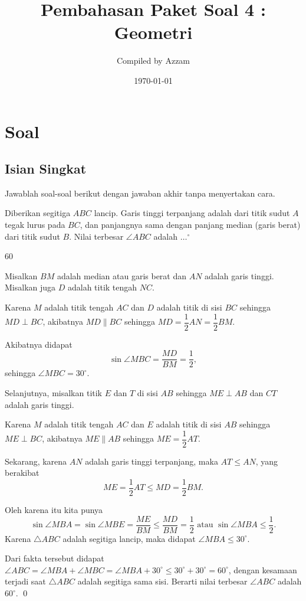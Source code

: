 \documentclass[11pt]{scrartcl}
\begin{document}
	\title{Pembahasan Paket Soal 4 : Geometri} %
	\date{\today}
	\author{Compiled by Azzam}
	\maketitle
	\newpage
	
	\section{Soal}
\subsection{Isian Singkat}
Jawablah soal-soal berikut dengan jawaban akhir tanpa menyertakan cara.

	\begin{soalbaru}
		Diberikan segitiga $ABC$ lancip. Garis tinggi terpanjang adalah dari titik sudut $A$ tegak
			lurus pada $BC$, dan panjangnya sama dengan panjang median (garis berat) dari titik sudut $B$.
			Nilai terbesar $\angle ABC$ adalah $\dots^\circ$
			
			\begin{jawaban}
			60
			\end{jawaban}
			\begin{solusi}
			Misalkan $BM$ adalah median atau garis berat dan $AN$ adalah garis tinggi. Misalkan juga $D$ adalah titik tengah $NC$.
			
			Karena $M$ adalah titik tengah $AC$ dan $D$ adalah titik di sisi $BC$ sehingga $MD \perp BC$, akibatnya $MD \parallel BC$ sehingga $MD=\dfrac{1}{2}AN=\dfrac{1}{2}BM$.
			
			Akibatnya didapat $$\sin \angle MBC = \dfrac{MD}{BM} = \dfrac{1}{2},$$ sehingga $\angle MBC = 30^\circ$.
			
			Selanjutnya, misalkan titik $E$ dan $T$ di sisi $AB$ sehingga $ME \perp AB$ dan $CT$ adalah garis tinggi.
			
			Karena $M$ adalah titik tengah $AC$ dan $E$ adalah titik di sisi $AB$ sehingga $ME \perp BC$, akibatnya $ME \parallel AB$ sehingga $ME=\dfrac{1}{2}AT$.
			
			Sekarang, karena $AN$ adalah garis tinggi terpanjang, maka $AT \le AN$, yang berakibat $$ME=\dfrac{1}{2}AT \le MD=\dfrac{1}{2}BM.$$
			
			Oleh karena itu kita punya $$\sin \angle MBA = \sin \angle MBE = \dfrac{ME}{BM} \le \dfrac{MD}{BM} = \dfrac{1}{2} \text{ atau } \sin \angle MBA \le \dfrac{1}{2}.$$ 
			Karena $\triangle ABC$ adalah segitiga lancip, maka didapat $\angle MBA \le 30^\circ$.
			
			Dari fakta tersebut didapat $\angle ABC = \angle MBA + \angle MBC = \angle MBA  + 30^\circ \le 30^\circ + 30^\circ = 60^\circ$, dengan kesamaan terjadi saat $\triangle ABC$ adalah segitiga sama sisi. Berarti nilai terbesar $\angle ABC$ adalah $60^\circ$. \qed
			\end{solusi}
	\end{soalbaru}
	
\end{document}
